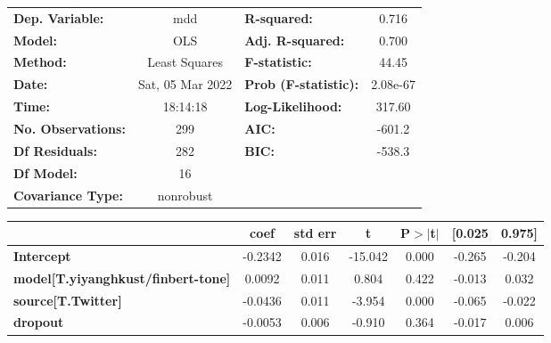 \begin{center}
\begin{tabular}{lclc}
\toprule
\textbf{Dep. Variable:}                    &       mdd        & \textbf{  R-squared:         } &     0.716   \\
\textbf{Model:}                            &       OLS        & \textbf{  Adj. R-squared:    } &     0.700   \\
\textbf{Method:}                           &  Least Squares   & \textbf{  F-statistic:       } &     44.45   \\
\textbf{Date:}                             & Sat, 05 Mar 2022 & \textbf{  Prob (F-statistic):} &  2.08e-67   \\
\textbf{Time:}                             &     18:14:18     & \textbf{  Log-Likelihood:    } &    317.60   \\
\textbf{No. Observations:}                 &         299      & \textbf{  AIC:               } &    -601.2   \\
\textbf{Df Residuals:}                     &         282      & \textbf{  BIC:               } &    -538.3   \\
\textbf{Df Model:}                         &          16      & \textbf{                     } &             \\
\textbf{Covariance Type:}                  &    nonrobust     & \textbf{                     } &             \\
\bottomrule
\end{tabular}
\begin{tabular}{lcccccc}
                                           & \textbf{coef} & \textbf{std err} & \textbf{t} & \textbf{P$> |$t$|$} & \textbf{[0.025} & \textbf{0.975]}  \\
\midrule
\textbf{Intercept}                         &      -0.2342  &        0.016     &   -15.042  &         0.000        &       -0.265    &       -0.204     \\
\textbf{model[T.yiyanghkust/finbert-tone]} &       0.0092  &        0.011     &     0.804  &         0.422        &       -0.013    &        0.032     \\
\textbf{source[T.Twitter]}                 &      -0.0436  &        0.011     &    -3.954  &         0.000        &       -0.065    &       -0.022     \\
\textbf{dropout}                           &      -0.0053  &        0.006     &    -0.910  &         0.364        &       -0.017    &        0.006     \\

\end{tabular}
\end{center}
